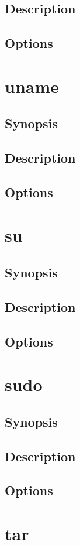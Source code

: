 \documentclass[a4paper, 10pt, onecolumn, openright, oneside]{book}
\begin{document}
			\subsection{Description}
			\subsection{Options}
		\section{uname}
			\subsection{Synopsis}
			\subsection{Description}
			\subsection{Options}
		\section{su}
			\subsection{Synopsis}
			\subsection{Description}
			\subsection{Options}
		\section{sudo}
			\subsection{Synopsis}
			\subsection{Description}
			\subsection{Options}
		\section{tar}
\end{document}
